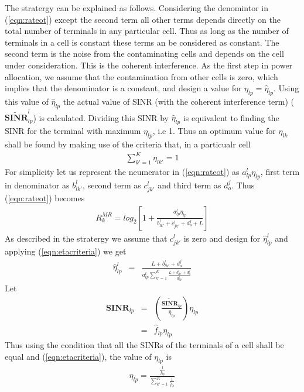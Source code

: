 \documentclass[10pt, a4paper, twoside,fleqn]{article}
\begin{document}
	The stratergy can be explained as follows. Considering the denomintor in (\ref{eqn:rateot}) except the second term all other terms depends directly on the total number of terminals in any particular cell. Thus as long as the number of terminals in a cell is constant these terms an be considered as constant. The second term is the noise from the contaminating cells and depends on the cell under consideration. This is the coherent interference. As the first step in power allocation, we assume that the contamination from other cells is zero, which implies that the denominator is a constant, and design a value for $\eta_{lp}=\hat \eta_{lp}$. Using this value of $\hat \eta_{lp}$ the actual value of SINR (with the coherent interference term) ($\mathbf{\widetilde{SINR}}_{lp}^{l}$) is calculated. Dividing this SINR by $\hat \eta_{lp}$ is equivalent to finding the SINR for the terminal with maximum $\eta_{lp}$, i.e 1. Thus an optimum value for $\eta_{lk}$ shall be found by making use of the criteria that, in a particualr cell 
\begin{eqnarray}\label{eqn:etacriteria}
	\sum\limits_{k'=1}^{K}\eta_{lk'}=1
\end{eqnarray}
	For simplicity let us represent the neumerator in (\ref{eqn:rateot}) as $a_{lp}^{l}\eta_{lp} $, first term in denominator as $b_{lk'}^{l}$, second term as $c_{jk'}^{l}$ and third term as $d_{o}^{j}$. Thus (\ref{eqn:rateot}) becomes
\begin{eqnarray}
	R_k^{MR} = log_2\left[ 1+ \frac{a_{lp}^{l}\eta_{lp}}{b_{lk'}^{l}+c_{jk'}^{l}+d_{o}^{j}+L}\right]
\end{eqnarray}
 As described in the stratergy we assume that $c_{jk'}^{l}$ is zero and design for $\hat \eta_{lp}^{l}$ and applying (\ref{eqn:etacriteria}) we get
\begin{eqnarray}
	\hat \eta_{lp}^{l} &=& \frac{L+b_{lk'}^{l}+d_{o}^{j}}{a_{lp}^{l}\sum\limits_{k'=1}^{K}\frac{L+b_{lk'}^{l}+d_{o}^{j}}{a_{lk'}^{l}}}
\end{eqnarray}
Let 
\begin{eqnarray}
	\mathbf{SINR}_{lp} &=& \left(\frac{\mathbf{\widetilde{SINR}}_{lp}}{\hat \eta_{lp}}\right) \eta_{lp}\nonumber \\
                  &=& \hat f_{lp}\eta_{lp}
\end{eqnarray}
Thus using the condition that all the SINRs of the terminals of a cell shall be equal and (\ref{eqn:etacriteria}), the value of $\eta_{lp}$ is
\begin{eqnarray}
	\eta_{lp} = \frac{\frac{1}{\hat f_{lp}}}{\sum\limits_{k'=1}^{K}\frac{1}{\hat f_{lp}}}
\end{eqnarray}
\end{document}
